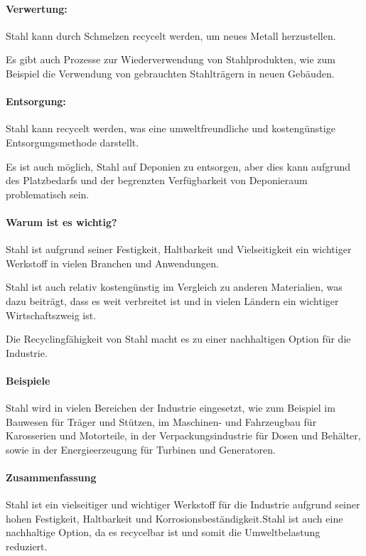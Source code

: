 \documentclass{article}
\begin{document}
\begin{multicols}{3}
\paragraph{Verwertung:}
\begin{compactitem}
\item Stahl kann durch Schmelzen recycelt werden, um neues Metall herzustellen.
\item Es gibt auch Prozesse zur Wiederverwendung von Stahlprodukten, wie zum
  Beispiel die Verwendung von gebrauchten Stahlträgern in neuen Gebäuden.
\end{compactitem}

\paragraph{Entsorgung:}
\begin{compactitem}
\item Stahl kann recycelt werden, was eine umweltfreundliche und kostengünstige
  Entsorgungsmethode darstellt.
\item Es ist auch möglich, Stahl auf Deponien zu entsorgen, aber dies kann
  aufgrund des Platzbedarfs und der begrenzten Verfügbarkeit von Deponieraum
  problematisch sein.
\end{compactitem}

\paragraph{Warum ist es wichtig?}
\begin{compactitem}
\item Stahl ist aufgrund seiner Festigkeit, Haltbarkeit und Vielseitigkeit ein
  wichtiger Werkstoff in vielen Branchen und Anwendungen.
\item Stahl ist auch relativ kostengünstig im Vergleich zu anderen Materialien,
  was dazu beiträgt, dass es weit verbreitet ist und in vielen Ländern ein
  wichtiger Wirtschaftszweig ist.
\item Die Recyclingfähigkeit von Stahl macht es zu einer nachhaltigen Option
  für die Industrie.
\end{compactitem}

\paragraph{Beispiele}
Stahl wird in vielen Bereichen der Industrie eingesetzt, wie zum Beispiel
  im Bauwesen für Träger und Stützen, im Maschinen- und Fahrzeugbau für
  Karosserien und Motorteile, in der Verpackungsindustrie für Dosen und
  Behälter, sowie in der Energieerzeugung für Turbinen und Generatoren.

\paragraph{Zusammenfassung}
Stahl ist ein vielseitiger und wichtiger Werkstoff für die Industrie aufgrund
seiner hohen Festigkeit, Haltbarkeit und Korrosionsbeständigkeit.Stahl ist auch eine nachhaltige
Option, da es recycelbar ist und somit die Umweltbelastung reduziert.
\end{multicols}
\end{document}
